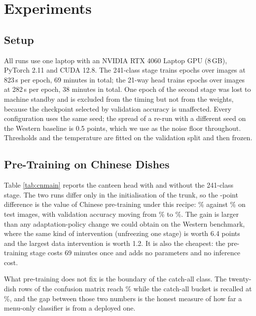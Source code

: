 \section{Experiments}
\label{sec:exp}
\subsection{Setup}
All runs use one laptop with an NVIDIA RTX 4060 Laptop GPU (8\,GB), PyTorch 2.11
and CUDA 12.8. The 241-class stage trains \cnPreEpochs{} epochs over
\cnPreTrainN{} images at 823\,s per epoch, 69 minutes in total; the 21-way head
trains \cnEpochs{} epochs over \cnTrainN{} images at 282\,s per epoch, 38 minutes
in total. One epoch of the second stage was lost to machine standby and is
excluded from the timing but not from the weights, because the checkpoint
selected by validation accuracy is unaffected. Every configuration uses the same
seed; the spread of a re-run with a different seed on the Western baseline is
0.5 points, which we use as the noise floor throughout. Thresholds and the
temperature are fitted on the validation split and then frozen.

\subsection{Pre-Training on Chinese Dishes}
\label{sec:pretrain}
Table \ref{tab:cnmain} reports the canteen head with and without the 241-class
stage. The two runs differ only in the initialisation of the trunk, so the
\cnGainPretrain-point difference is the value of Chinese pre-training under this
recipe: \cnNoPreTest\% against \cnTest\% on \cnTestN{} test images, with validation
accuracy moving from \cnNoPreVal\% to \cnVal\%. The gain is larger than any
adaptation-policy change we could obtain on the Western benchmark, where the same
kind of intervention (unfreezing one stage) is worth 6.4 points and the largest
data intervention is worth 1.2. It is also the cheapest: the pre-training stage
costs 69 minutes once and adds no parameters and no inference cost.

What pre-training does not fix is the boundary of the catch-all class. The
twenty-dish rows of the confusion matrix reach \cnDishAcc\% while the catch-all
bucket is recalled at \cnOtherRecall\%, and the gap between those two numbers is
the honest measure of how far a menu-only classifier is from a deployed one.

